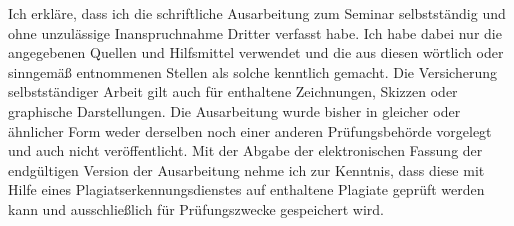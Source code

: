 \documentclass[11pt,a4paper]{article}
\begin{document}
Ich erkläre, dass ich die schriftliche Ausarbeitung zum Seminar selbstständig
und ohne unzulässige Inanspruchnahme Dritter verfasst habe. Ich habe dabei nur
die angegebenen Quellen und Hilfsmittel verwendet und die aus diesen wörtlich
oder sinngemäß entnommenen Stellen als solche kenntlich gemacht. Die Versicherung
selbstständiger Arbeit gilt auch für enthaltene Zeichnungen, Skizzen oder
graphische Darstellungen. Die Ausarbeitung wurde bisher in gleicher oder ähnlicher
Form weder derselben noch einer anderen Prüfungsbehörde vorgelegt und auch nicht
veröffentlicht. Mit der Abgabe der elektronischen Fassung der endgültigen Version
der Ausarbeitung nehme ich zur Kenntnis, dass diese mit Hilfe eines
Plagiatserkennungsdienstes auf enthaltene Plagiate geprüft werden kann und
ausschließlich für Prüfungszwecke gespeichert wird.

\newpage
\printbibliography
\end{document}
